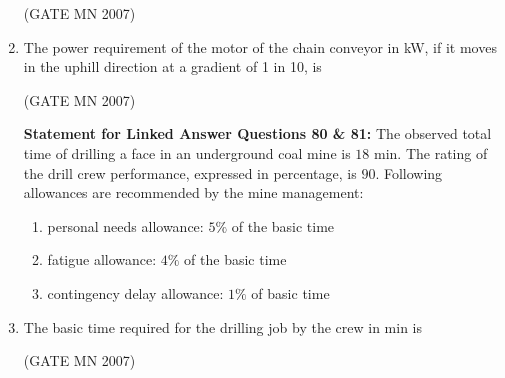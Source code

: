 \documentclass[journal]{IEEEtran}
\begin{document}
\begin{enumerate}
	\hfill (GATE MN 2007)
\begin{enumerate}
\end{enumerate}


\item The power requirement of the motor of the chain conveyor in kW, if it moves in the uphill direction at a gradient of 1 in 10, is 


	\hfill (GATE MN 2007)
\begin{enumerate}
\end{enumerate}

\textbf{Statement for Linked Answer Questions 80 \& 81:} The observed total time of drilling a face in an underground coal mine is $18$ min. The rating of the drill crew performance, expressed in percentage, is $90$.  
Following allowances are recommended by the mine management:
\begin{enumerate}
\item personal needs allowance: $5\%$ of the basic time
\item fatigue allowance: $4\%$ of the basic time
\item contingency delay allowance: $1\%$ of basic time
\end{enumerate}

\item The basic time required for the drilling job by the crew in min is


	\hfill (GATE MN 2007)
\begin{enumerate}
\end{enumerate}


\end{enumerate}
\end{document}

